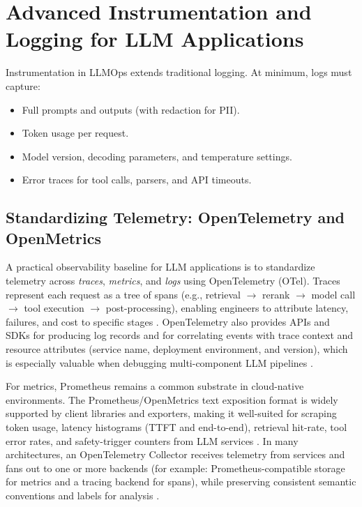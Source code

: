 \section{Advanced Instrumentation and Logging for LLM Applications}
\label{sec:advanced-instrumentation-and-logging-for-llm-applications}
Instrumentation in LLMOps extends traditional logging. At minimum, logs must capture:
\begin{itemize}
    \item Full prompts and outputs (with redaction for PII).
    \item Token usage per request.
    \item Model version, decoding parameters, and temperature settings.
    \item Error traces for tool calls, parsers, and API timeouts.
\end{itemize}

\subsection{Standardizing Telemetry: OpenTelemetry and OpenMetrics}\label{sec:otel-openmetrics}
A practical observability baseline for LLM applications is to standardize telemetry across \emph{traces}, \emph{metrics}, and \emph{logs} using OpenTelemetry (OTel). Traces represent each request as a tree of spans (e.g., retrieval $\rightarrow$ rerank $\rightarrow$ model call $\rightarrow$ tool execution $\rightarrow$ post-processing), enabling engineers to attribute latency, failures, and cost to specific stages \cite{otel_traces,otel_spec}. OpenTelemetry also provides APIs and SDKs for producing log records and for correlating events with trace context and resource attributes (service name, deployment environment, and version), which is especially valuable when debugging multi-component LLM pipelines \cite{otel_logs_concepts}.

For metrics, Prometheus remains a common substrate in cloud-native environments. The Prometheus/OpenMetrics text exposition format is widely supported by client libraries and exporters, making it well-suited for scraping token usage, latency histograms (TTFT and end-to-end), retrieval hit-rate, tool error rates, and safety-trigger counters from LLM services \cite{openmetrics_spec,prometheus_instrumentation,prometheus_clientlibs}. In many architectures, an OpenTelemetry Collector \cite{otel_collector} receives telemetry from services and fans out to one or more backends (for example: Prometheus-compatible storage for metrics and a tracing backend for spans), while preserving consistent semantic conventions and labels for analysis \cite{otel_spec}.

